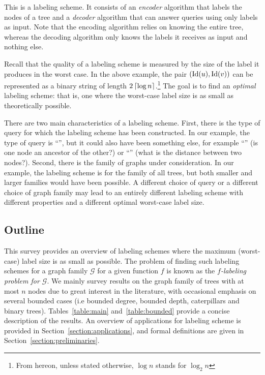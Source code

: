 This is a labeling scheme. It consists of an \emph{encoder} algorithm that labels the nodes of a tree and a \emph{decoder} algorithm that can answer \adjacency queries using only labels as input. Note that the encoding algorithm relies on knowing the entire tree, whereas the decoding algorithm only knows the labels it receives as input and nothing else. 

Recall that the quality of a labeling scheme is measured by the size of the label it produces in the worst case.
In the above example, the pair $(\operatorname{Id}(u),\operatorname{Id}(v))$ can be represented as a binary string of length $2\left\lceil{\log n}\right\rceil$.\footnote{From hereon, unless stated otherwise,  $\log n$ stands for $ \log_{2} n$}%
The  goal is to find an \emph{optimal} labeling scheme: that is, one where the worst-case label size is as small as theoretically possible.

There are two main characteristics of a labeling scheme. First, there is the type of query for which the labeling scheme has been constructed. In our example, the type of query is ``\adjacency'', but it could also have been something else, for example ``\ancestry'' (is one node an ancestor of the other?) or ``\distance'' (what is the distance between  two nodes?). Second, there is the family of graphs under consideration. In our example, the labeling scheme is for the family of all trees, but both smaller and larger families would have been possible. A different choice of query or a different choice of graph family may lead to an entirely different labeling scheme with different properties and a different optimal worst-case label size. 

\subsection{Outline}
This survey provides an overview of labeling schemes where the maximum (worst-case) label size is as small as possible.
The problem of finding such labeling schemes for a graph family $\mathcal{G}$  for a given function $f$ is known as the \emph{$f$-labeling problem for $\mathcal{G}$}.
We mainly survey results on  the graph family of trees with at most $n$ nodes due to great interest in the literature, with occasional emphasis on several bounded cases (i.e bounded degree, bounded depth, caterpillars and binary trees).
Tables~\ref{table:main} and~\ref{table:bounded}  provide a concise description of the results.
An overview of applications for labeling scheme is provided in Section~\ref{section:applications}, and formal definitions are given in Section~\ref{section:preliminaries}.

